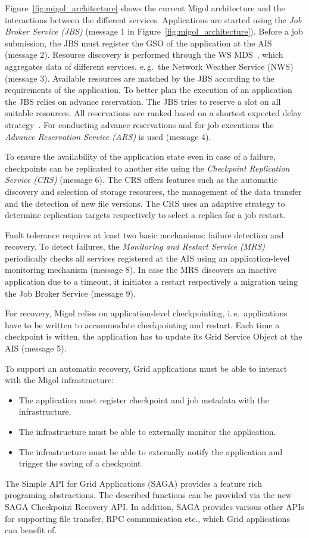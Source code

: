 \documentclass[times, 10pt,twocolumn]{article}
\begin{document}
Figure~\ref{fig:migol_architecture} shows the current Migol architecture and
the interactions between the different services.  Applications are
started using the {\em Job Broker Service (JBS)} (message 1 in 
Figure~\ref{fig:migol_architecture}). Before a job
submission, the JBS must register the GSO of the application at the AIS (message 2).
Resource discovery is performed through the WS MDS~\cite{schopf06},
which aggregates data of different services, e.\,g.\ the Network
Weather Service (NWS)~\cite{NWS99} (message 3).  Available resources are matched
by the JBS according to the requirements of the application. To better plan the execution of 
an application the JBS relies on advance reservation. The JBS tries to reserve a slot on all suitable
resources. All reservations are ranked based on a shortest expected
delay strategy~\cite{Jeske:2007wj}.  For conducting advance reservations and for job executions the
\emph{Advance Reservation Service (ARS)} is used (message 4).
             
To ensure the availability of the application state even in case of a failure, 
checkpoints can be replicated to another site  using the \emph{Checkpoint Replication Service
(CRS)} (message 6).  The CRS offers features such as the automatic discovery and selection of storage resources, 
the management of the data transfer and the detection of new file versions. 
The CRS uses an adaptive strategy to determine replication  targets respectively to select a replica for a
job restart.


Fault tolerance requires at least two basic mechanisms: failure
detection and recovery. To detect failures, the \emph{Monitoring and Restart Service (MRS)}
periodically checks all services registered at the AIS using an
application-level monitoring mechanism (message 8). In case the MRS discovers an inactive
application due to a timeout, it initiates a restart respectively a migration using the
Job Broker Service (message 9).  
          
For recovery, Migol relies on 
application-level checkpointing, i.\,e.\ applications have to be
written to accommodate checkpointing and restart. 
Each time a checkpoint is witten, the application has to update
its Grid Service Object at the AIS (message 5). 

To support an automatic recovery, Grid applications must be able to interact with the Migol infrastructure:
\begin{itemize}
    \item The application must register checkpoint and job metadata with the infrastructure.
    \item The infrastructure must be able to externally monitor the application.
    \item The infrastructure must be able to externally notify the application and trigger the saving of a checkpoint.
\end{itemize}  
The Simple API for Grid Applications (SAGA) provides a feature rich programing abstractions. The described functions 
can be  provided via the new SAGA Checkpoint Recovery API. In addition, SAGA provides  
various other APIs for supporting file transfer, RPC communication etc., which Grid applications can benefit of.                           
\end{document}
